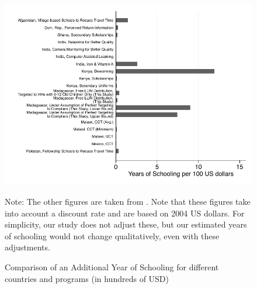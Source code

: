\documentclass[fleqn,11pt]{article}
\begin{document}
\begin{figure}[h]
\centering
\includegraphics{jpal_yos_new_updated.pdf}
\caption{Comparison of an Additional Year of Schooling for different countries and programs (in hundreds of USD) }
\medskip
\begin{minipage}{0.65\textwidth} %
{\footnotesize Note: The other figures are taken from  \cite{the_abdul_latif_jameel_poverty_action_lab_roll_2017}. Note that these figures take into account a discount rate and are based on 2004 US dollars. For simplicity, our study does not adjust these, but our estimated years of schooling would not change qualitatively, even with these adjustments. \par}
\end{minipage}
\label{jpal_yos}
\end{figure}
\end{document}
